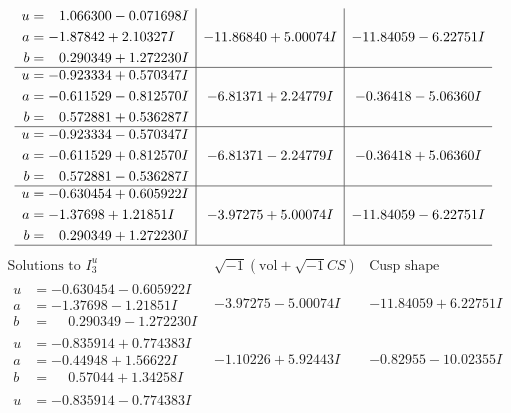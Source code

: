 \documentclass[1p]{elsarticle_modified}
\theoremstyle{definition}
\newcommand{\I}{\sqrt{-1}}
\begin{document}
$$\begin{array}{c|c|c}
\begin{aligned}
u &= \phantom{-}1.066300 - 0.071698 I \\
a &= -1.87842 + 2.10327 I \\
b &= \phantom{-}0.290349 + 1.272230 I\end{aligned}
 & -11.86840 + 5.00074 I & -11.84059 - 6.22751 I \\ \hline\begin{aligned}
u &= -0.923334 + 0.570347 I \\
a &= -0.611529 - 0.812570 I \\
b &= \phantom{-}0.572881 + 0.536287 I\end{aligned}
 & -6.81371 + 2.24779 I & -0.36418 - 5.06360 I \\ \hline\begin{aligned}
u &= -0.923334 - 0.570347 I \\
a &= -0.611529 + 0.812570 I \\
b &= \phantom{-}0.572881 - 0.536287 I\end{aligned}
 & -6.81371 - 2.24779 I & -0.36418 + 5.06360 I \\ \hline\begin{aligned}
u &= -0.630454 + 0.605922 I \\
a &= -1.37698 + 1.21851 I \\
b &= \phantom{-}0.290349 + 1.272230 I\end{aligned}
 & -3.97275 + 5.00074 I & -11.84059 - 6.22751 I\\
 \hline 
 \end{array}$$\newpage$$\begin{array}{c|c|c}  
\text{Solutions to }I^u_{3}& \I (\text{vol} + \sqrt{-1}CS) & \text{Cusp shape}\\
 \hline 
\begin{aligned}
u &= -0.630454 - 0.605922 I \\
a &= -1.37698 - 1.21851 I \\
b &= \phantom{-}0.290349 - 1.272230 I\end{aligned}
 & -3.97275 - 5.00074 I & -11.84059 + 6.22751 I \\ \hline\begin{aligned}
u &= -0.835914 + 0.774383 I \\
a &= -0.44948 + 1.56622 I \\
b &= \phantom{-}0.57044 + 1.34258 I\end{aligned}
 & -1.10226 + 5.92443 I & -0.82955 - 10.02355 I \\ \hline\begin{aligned}
u &= -0.835914 - 0.774383 I \\

\end{aligned}
\end{array}$$
\end{document}
